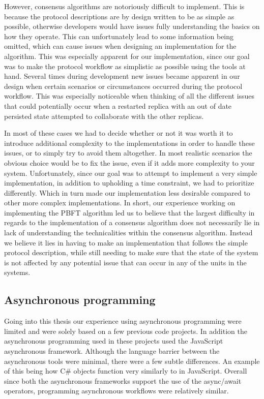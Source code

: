However, consensus algorithms are notoriously difficult to implement. This is because the protocol descriptions are by design written to be as simple as possible, otherwise developers would have issues fully understanding the basics on how they operate. This can unfortunately lead to some information being omitted, which can cause issues when designing an implementation for the algorithm. This was especially apparent for our implementation, since our goal was to make the protocol workflow as simplistic as possible using the tools at hand. Several times during development new issues became apparent in our design when certain scenarios or circumstances occurred during the protocol workflow. This was especially noticeable when thinking of all the different issues that could potentially occur when a restarted replica with an out of date persisted state attempted to collaborate with the other replicas.

In most of these cases we had to decide whether or not it was worth it to introduce additional complexity to the implementations in order to handle these issues, or to simply try to avoid them altogether. In most realistic scenarios the obvious choice would be to fix the issue, even if it adds more complexity to your system. Unfortunately, since our goal was to attempt to implement a very simple implementation, in addition to upholding a time constraint, we had to prioritize differently. Which in turn made our implementation less desirable compared to other more complex implementations. In short, our experience working on implementing the PBFT algorithm led us to believe that the largest difficulty in regards to the implementation of a consensus algorithm does not necessarily lie in lack of understanding the technicalities within the consensus algorithm. Instead we believe it lies in having to make an implementation that follows the simple protocol description, while still needing to make sure that the state of the system is not affected by any potential issue that can occur in any of the units in the systems. 

\subsection{Asynchronous programming}
Going into this thesis our experience using asynchronous programming were limited and were solely based on a few previous code projects. In addition the asynchronous programming used in these projects used the JavaScript asynchronous framework. Although the language barrier between the asynchronous tools were minimal, there were a few subtle differences. An example of this being how C\#  objects function very similarly to  in JavaScript. Overall since both the asynchronous frameworks support the use of the async/await operators, programming asynchronous workflows were relatively similar.

